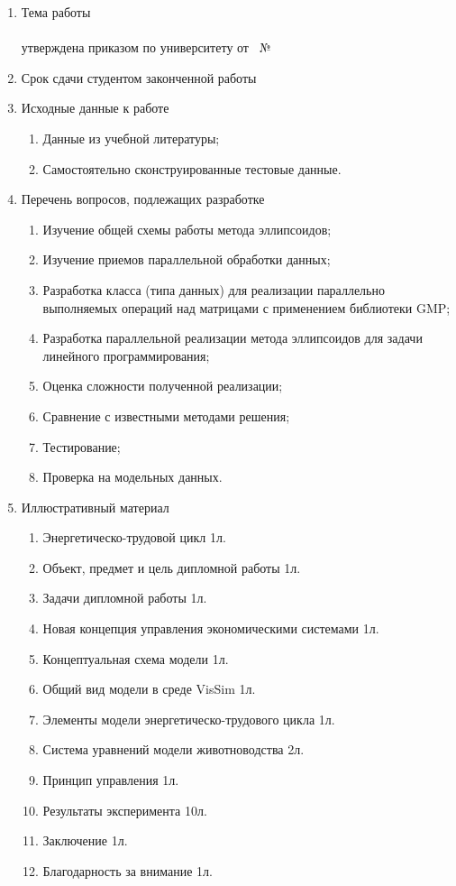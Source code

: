 \begin{enumerate}[label*=\arabic*.]
\item Тема работы \\
 \\
утверждена приказом по университету от~ №

\item Срок сдачи студентом законченной работы 

\item Исходные данные к работе

\begin{enumerate}[label*=\arabic*.]
\item Данные из учебной литературы;
\item Самостоятельно сконструированные тестовые данные.
\end{enumerate}

\item Перечень вопросов, подлежащих разработке
\begin{enumerate}[label*=\arabic*.]
\item Изучение общей схемы работы метода эллипсоидов;
\item Изучение приемов параллельной обработки данных;
\item Разработка класса (типа данных) для реализации параллельно выполняемых операций над матрицами с применением библиотеки GMP;
\item Разработка параллельной реализации метода эллипсоидов для задачи линейного программирования;
\item Оценка сложности полученной реализации;
\item Сравнение с известными методами решения;
\item Тестирование;
\item Проверка на модельных данных.
\end{enumerate}

\item Иллюстративный материал 
\begin{enumerate}[label*=\arabic*.]
\item Энергетическо-трудовой цикл 1л.
\item Объект, предмет и цель дипломной работы 1л.
\item Задачи дипломной работы 1л.
\item Новая концепция управления экономическими системами 1л.
\item Концептуальная схема модели 1л.
\item Общий вид модели в среде VisSim 1л.
\item Элементы модели энергетическо-трудового цикла 1л.
\item Система уравнений модели животноводства 2л.
\item Принцип управления 1л.
\item Результаты эксперимента 10л.
\item Заключение 1л.
\item Благодарность за внимание 1л.
\end{enumerate}


\end{enumerate}

